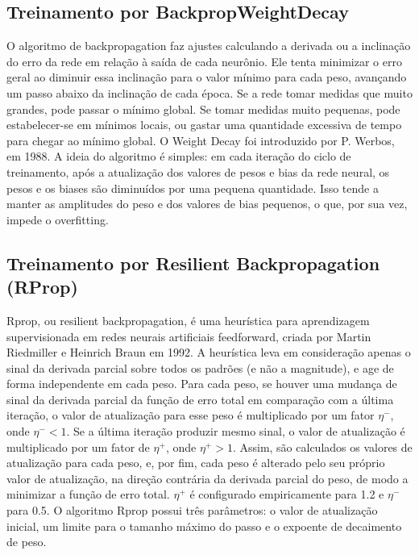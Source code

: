 \documentclass{article}
\begin{document}
\subsection{Treinamento por BackpropWeightDecay}
O algoritmo de backpropagation faz ajustes calculando a derivada ou a inclinação do erro da rede em relação à saída de cada neurônio. Ele tenta minimizar o erro geral ao diminuir essa inclinação para o valor mínimo para cada peso, avançando um passo abaixo da inclinação de cada época. Se a rede tomar medidas que muito grandes, pode passar o mínimo global. Se tomar medidas muito pequenas, pode estabelecer-se em mínimos locais, ou gastar uma quantidade excessiva de tempo para chegar ao mínimo global. 
O Weight Decay foi introduzido por P. Werbos, em 1988. A ideia do algoritmo é simples: em cada iteração do ciclo de treinamento, após a atualização dos valores de pesos e bias da rede neural, os pesos e os biases são diminuídos por uma pequena quantidade. Isso tende a manter as amplitudes do peso e dos valores de bias pequenos, o que, por sua vez, impede o overfitting.

\subsection{Treinamento por Resilient Backpropagation (RProp)}
Rprop, ou resilient backpropagation, é uma heurística para aprendizagem supervisionada em redes neurais artificiais feedforward, criada por Martin Riedmiller e Heinrich Braun em 1992. A heurística leva em consideração apenas o sinal da derivada parcial sobre todos os padrões (e não a magnitude), e age de forma independente em cada peso. Para cada peso, se houver uma mudança de sinal da derivada parcial da função de erro total em comparação com a última iteração, o valor de atualização para esse peso é multiplicado por um fator $\eta^-$, onde $\eta^- < 1$. Se a última iteração produzir mesmo sinal, o valor de atualização é multiplicado por um fator de $\eta^+$, onde $\eta^+ > 1$. Assim, são calculados os valores de atualização para cada peso, e, por fim, cada peso é alterado pelo seu próprio valor de atualização, na direção contrária da derivada parcial do peso, de modo a minimizar a função de erro total. $\eta^+$ é configurado empiricamente para 1.2 e $\eta^-$ para 0.5.
O algoritmo Rprop possui três parâmetros: o valor de atualização inicial, um limite para o tamanho máximo do passo e o expoente de decaimento de peso.
\end{document}
